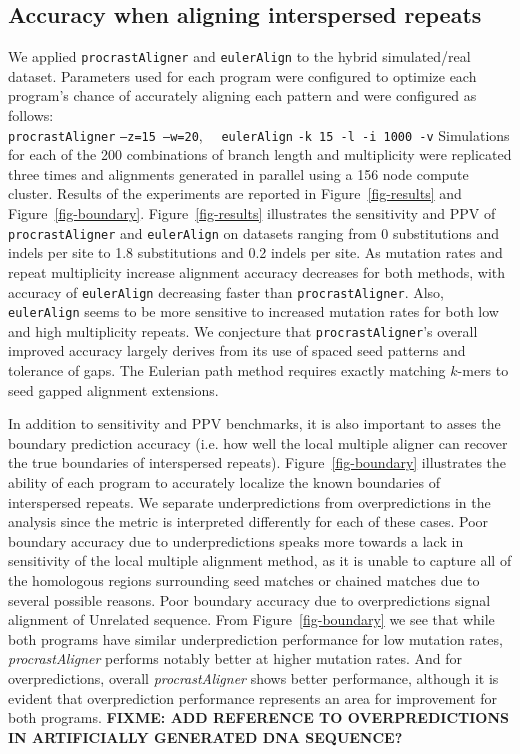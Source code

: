\documentclass{llncs}
\begin{document}
\subsection{Accuracy when aligning interspersed repeats}
We applied \texttt{procrastAligner} and \texttt{eulerAlign} to the
hybrid simulated/real dataset.  Parameters used for each program were
configured to optimize each program's chance of accurately aligning
each pattern and were configured as
follows:\\
\texttt{procrastAligner} \texttt{--z=15 --w=20}, \ \
\texttt{eulerAlign} \texttt{-k 15 -l -i 1000 -v}
Simulations for each of the 200 combinations of branch length and
multiplicity were replicated three times and alignments generated in
parallel using a 156 node compute cluster.  Results of the experiments
are reported in Figure~\ref{fig-results} and
Figure~\ref{fig-boundary}. Figure~\ref{fig-results} illustrates the
sensitivity and PPV of \texttt{procrastAligner} and
\texttt{eulerAlign} on datasets ranging from 0 substitutions and
indels per site to 1.8 substitutions and 0.2 indels per site.  As
mutation rates and repeat multiplicity increase alignment accuracy
decreases for both methods, with accuracy of \texttt{eulerAlign}
decreasing faster than \texttt{procrastAligner}.  Also,
\texttt{eulerAlign} seems to be more sensitive to increased mutation
rates for both low and high multiplicity repeats. We conjecture that
\texttt{procrastAligner}'s overall improved accuracy largely derives
from its use of spaced seed patterns\cite{ref-procrast} and tolerance
of gaps. The Eulerian path method requires exactly matching $k$-mers
to seed gapped alignment extensions.

In addition to sensitivity and PPV benchmarks, it is also important to
asses the boundary prediction accuracy (i.e. how well the local
multiple aligner can recover the true boundaries of interspersed
repeats). Figure~\ref{fig-boundary} illustrates the ability of each
program to accurately localize the known boundaries of interspersed
repeats. We separate underpredictions from overpredictions in the
analysis since the metric is interpreted differently for each of these
cases. Poor boundary accuracy due to underpredictions speaks more
towards a lack in sensitivity of the local multiple alignment method,
as it is unable to capture all of the homologous regions surrounding
seed matches or chained matches due to several possible reasons. Poor
boundary accuracy due to overpredictions signal alignment of Unrelated
sequence. From Figure~\ref{fig-boundary} we see that while both
programs have similar underprediction performance for low mutation
rates, \emph{procrastAligner} performs notably better at higher
mutation rates. And for overpredictions, overall
\emph{procrastAligner} shows better performance, although it is
evident that overprediction performance represents an area for
improvement for both programs. \textbf{FIXME: ADD REFERENCE TO
OVERPREDICTIONS IN ARTIFICIALLY GENERATED DNA SEQUENCE?}
\end{document}
